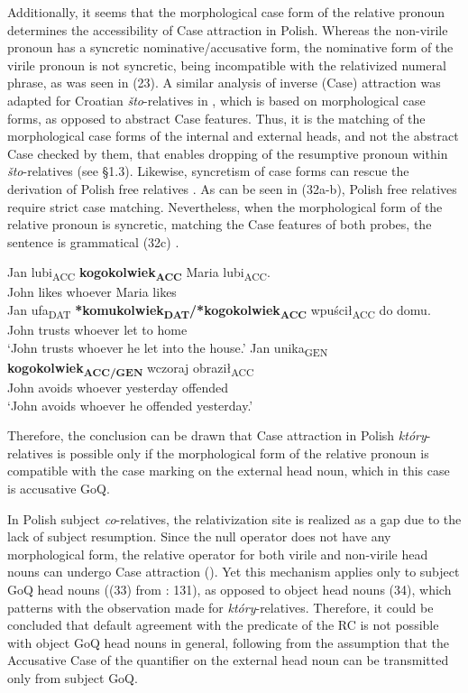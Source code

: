 \documentclass[output=paper]{langsci/langscibook}
\begin{document}
Additionally, it seems that the morphological case form of the relative pronoun determines the accessibility of Case attraction in Polish. Whereas the non-virile pronoun has a syncretic nominative/accusative form, the nominative form of the virile pronoun is not syncretic, being incompatible with the relativized numeral phrase, as was seen in (23). A similar analysis of inverse (Case) attraction was adapted for Croatian \textit{što}{}-relatives in \citet{Gračanin-Yuksek2013}, which is based on morphological case forms, as opposed to abstract Case features. Thus, it is the matching of the morphological case forms of the internal and external heads, and not the abstract Case checked by them, that enables dropping of the resumptive pronoun within \textit{što}{}-relatives (see §1.3). Likewise, syncretism of case forms can rescue the derivation of Polish free relatives \citep{Assmann2014Matching}. As can be seen in (32a-b), Polish free relatives require strict case matching. Nevertheless, when the morphological form of the relative pronoun is syncretic, matching the Case features of both probes, the sentence is grammatical (32c) \citep[3]{Assmann2014Matching}. 

\ea%
    \label{ex:leska:32}
    \ea
    \gll Jan   lubi\textsubscript{ACC}   \textbf{kogokolwiek\textsubscript{ACC}}   Maria lubi\textsubscript{ACC}.\\
         John   likes     whoever     Maria likes\\
    \ex
    \gll Jan  ufa\textsubscript{DAT}   \textbf{*komukolwiek\textsubscript{DAT}}\textbf{/*kogokolwiek\textsubscript{ACC}} wpuścił\textsubscript{ACC}   do   domu.\\
         John   trusts     whoever   let     to   home\\
    \glt ‘John trusts whoever he let into the house.’
    \ex
    \gll Jan   unika\textsubscript{GEN}   \textbf{kogokolwiek\textsubscript{ACC/GEN}} wczoraj   obraził\textsubscript{ACC}\\
         John   avoids   whoever       yesterday   offended\\
    \glt ‘John avoids whoever he offended yesterday.’
    \z
\z    

Therefore, the conclusion can be drawn that Case attraction in Polish \textit{który}{}-relatives is possible only if the morphological form of the relative pronoun is compatible with the case marking on the external head noun, which in this case is accusative GoQ. 

In Polish subject \textit{co}{}-relatives, the relativization site is realized as a gap due to the lack of subject resumption. Since the null operator does not have any morphological form, the relative operator for both virile and non-virile head nouns can undergo Case attraction (\citealt{Łęska2016}). Yet this mechanism applies only to subject GoQ head nouns ((33) from \citealt{Łęska2016}: 131), as opposed to object head nouns (34), which patterns with the observation made for \textit{który}{}-relatives. Therefore, it could be concluded that default agreement with the predicate of the RC is not possible with object GoQ head nouns in general, following from the assumption that the Accusative Case of the quantifier on the external head noun can be transmitted only from subject GoQ.
 
\end{document}
